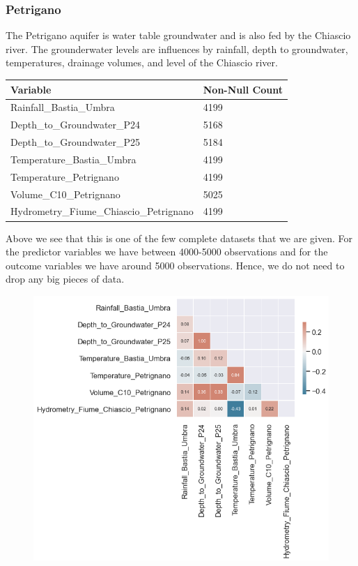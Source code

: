 \documentclass[12pt, letterpaper]{article}
\begin{document}
\subsubsection{Petrigano}
The Petrigano aquifer is water table groundwater and is also fed by the Chiascio river. The grounderwater levels are influences by rainfall, depth to groundwater, temperatures, drainage volumes, and level of the Chiascio river.

\begin{table}[H]
    \begin{tabular}{ll}
    \textbf{Variable}                       & \textbf{Non-Null Count} \\ \hline
    Rainfall\_Bastia\_Umbra                 & 4199                    \\
    Depth\_to\_Groundwater\_P24             & 5168                    \\
    Depth\_to\_Groundwater\_P25             & 5184                    \\
    Temperature\_Bastia\_Umbra              & 4199                    \\
    Temperature\_Petrignano                 & 4199                    \\
    Volume\_C10\_Petrignano                 & 5025                    \\
    Hydrometry\_Fiume\_Chiascio\_Petrignano & 4199                   
    \end{tabular}
    \centering
\end{table}

Above we see that this is one of the few complete datasets that we are given. For the predictor variables we have between 4000-5000 observations and for the outcome variables we have around 5000 observations. Hence, we do not need to drop any big pieces of data.

\begin{figure}[H]
    \includegraphics[width=.75\textwidth]{aq_petrigano_heatmap.png}
    \centering
\end{figure}
\end{document}
